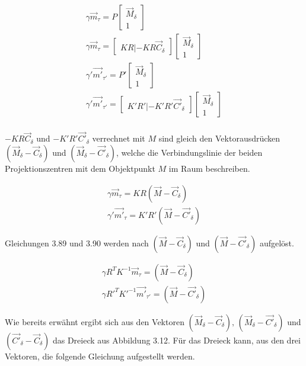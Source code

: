 \begin{gather}
\gamma\vec{m}_\tau = P \begin{bmatrix}\vec{M}_\delta\\1\end{bmatrix}\\
\gamma\vec{m}_\tau = \begin{bmatrix}KR|-KR\vec{C}_\delta\end{bmatrix}\begin{bmatrix}\vec{M}_\delta\\1\end{bmatrix}\\
\gamma'\vec{m'}_{\tau'} = P' \begin{bmatrix}\vec{M}_\delta\\1\end{bmatrix}\\
\gamma'\vec{m'}_{\tau'} = \begin{bmatrix}K'R'|-K'R'\vec{C'}_\delta\end{bmatrix}\begin{bmatrix}\vec{M}_\delta\\1\end{bmatrix}\\
\end{gather}

$-KR\vec{C}_\delta$ und $-K'R'\vec{C'}_\delta$ verrechnet mit $M$ sind gleich den Vektorausdrücken $(\vec{M}_\delta - \vec{C}_\delta)$ und $(\vec{M}_\delta - \vec{C'}_\delta)$, welche die Verbindungslinie der beiden Projektionszentren mit dem Objektpunkt $M$ im Raum beschreiben.

\begin{gather}
\gamma\vec{m}_\tau = KR(\vec{M}-\vec{C}_\delta)\\
\gamma'\vec{m'}_\tau = K'R'(\vec{M}-\vec{C'}_\delta)
\end{gather}

Gleichungen 3.89 und 3.90 werden nach $(\vec{M}-\vec{C}_\delta)$ und $(\vec{M}-\vec{C'}_\delta)$ aufgelöst.

\begin{gather}
\gamma R^TK^{-1}\vec{m}_\tau = (\vec{M}-\vec{C}_\delta)\\
\gamma R'^TK'^{-1}\vec{m'}_{\tau'} = (\vec{M}-\vec{C'}_\delta)
\end{gather}

Wie bereits erwähnt ergibt sich aus den Vektoren $(\vec{M}_\delta - \vec{C}_\delta),\, (\vec{M}_\delta - \vec{C'}_\delta)$ und $(\vec{C'}_\delta - \vec{C}_\delta)$ das Dreieck aus Abbildung 3.12. Für das Dreieck kann, aus den drei Vektoren, die folgende Gleichung aufgestellt werden. 

